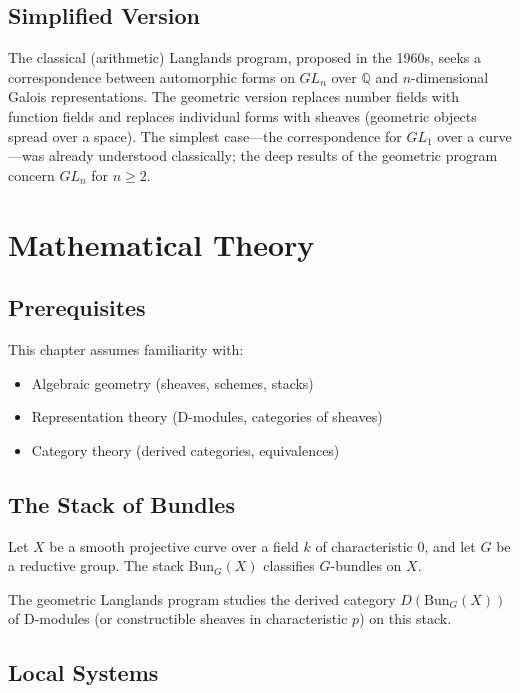 \subsection{Simplified Version}
The classical (arithmetic) Langlands program, proposed in the 1960s, seeks a correspondence between automorphic forms on $GL_n$ over $\mathbb{Q}$ and $n$-dimensional Galois representations. The geometric version replaces number fields with function fields and replaces individual forms with sheaves (geometric objects spread over a space). The simplest case---the correspondence for $GL_1$ over a curve---was already understood classically; the deep results of the geometric program concern $GL_n$ for $n \ge 2$.

\section{Mathematical Theory}


\subsection{Prerequisites}
This chapter assumes familiarity with:
\begin{itemize}
\item Algebraic geometry (sheaves, schemes, stacks)
\item Representation theory (D-modules, categories of sheaves)
\item Category theory (derived categories, equivalences)
\end{itemize}

\subsection{The Stack of Bundles}

\begin{definition}
Let $X$ be a smooth projective curve over a field $k$ of characteristic 0, and let $G$ be a reductive group. The stack $\text{Bun}_G(X)$ classifies $G$-bundles on $X$.
\end{definition}

The geometric Langlands program studies the derived category $D(\text{Bun}_G(X))$ of D-modules (or constructible sheaves in characteristic $p$) on this stack.

\subsection{Local Systems}

